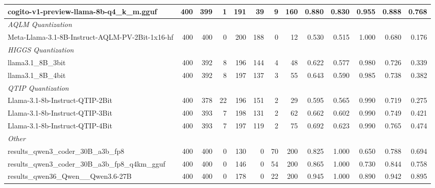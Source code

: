\begin{table}[htbp]
{\begin{tabular}{lrrrrrrrrrrrr}
    cogito-v1-preview-llama-8b-q4\_k\_m.gguf & 400 & 399 & 1 & 191 & 39 & 9 & 160 & 0.880 & 0.830 & 0.955 & 0.888 & 0.768 \\
    \midrule
    \multicolumn{13}{l}{\textit{AQLM Quantization}} \\
    \midrule
    Meta-Llama-3.1-8B-Instruct-AQLM-PV-2Bit-1x16-hf & 400 & 400 & 0 & 200 & 188 & 0 & 12 & 0.530 & 0.515 & 1.000 & 0.680 & 0.176 \\
    \midrule
    \multicolumn{13}{l}{\textit{HIGGS Quantization}} \\
    \midrule
    llama3.1\_8B\_3bit & 400 & 392 & 8 & 196 & 144 & 4 & 48 & 0.622 & 0.577 & 0.980 & 0.726 & 0.339 \\
    llama3.1\_8B\_4bit & 400 & 392 & 8 & 197 & 137 & 3 & 55 & 0.643 & 0.590 & 0.985 & 0.738 & 0.382 \\
    \midrule
    \multicolumn{13}{l}{\textit{QTIP Quantization}} \\
    \midrule
    Llama-3.1-8b-Instruct-QTIP-2Bit & 400 & 378 & 22 & 196 & 151 & 2 & 29 & 0.595 & 0.565 & 0.990 & 0.719 & 0.275 \\
    Llama-3.1-8b-Instruct-QTIP-3Bit & 400 & 393 & 7 & 198 & 131 & 2 & 62 & 0.662 & 0.602 & 0.990 & 0.749 & 0.421 \\
    Llama-3.1-8b-Instruct-QTIP-4Bit & 400 & 393 & 7 & 197 & 119 & 2 & 75 & 0.692 & 0.623 & 0.990 & 0.765 & 0.474 \\
    \midrule
    \multicolumn{13}{l}{\textit{Other}} \\
    \midrule
    results\_qwen3\_coder\_30B\_a3b\_fp8 & 400 & 400 & 0 & 130 & 0 & 70 & 200 & 0.825 & 1.000 & 0.650 & 0.788 & 0.694 \\
    results\_qwen3\_coder\_30B\_a3b\_fp8\_q4km\_gguf & 400 & 400 & 0 & 146 & 0 & 54 & 200 & 0.865 & 1.000 & 0.730 & 0.844 & 0.758 \\
    results\_qwen36\_Qwen\_\_Qwen3.6-27B & 400 & 400 & 0 & 178 & 0 & 22 & 200 & 0.945 & 1.000 & 0.890 & 0.942 & 0.895 \\
    \bottomrule
  \end{tabular}
  }
\end{table}

